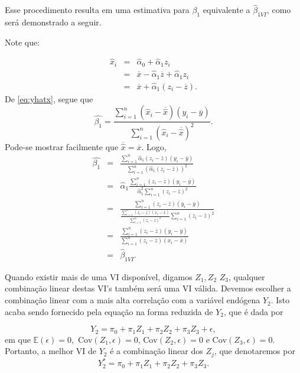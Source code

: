 \documentclass[
]{book}
\theoremstyle{definition}
\theoremstyle{definition}
\theoremstyle{definition}
\theoremstyle{remark}
\begin{document}
Esse procedimento resulta em uma estimativa para \(\beta_1\) equivalente a \(\hat{\beta}_{1VI}\), como será demonstrado a seguir.

Note que:

\begin{eqnarray*}
   \hat{x}_i&=& \hat{\alpha}_0+\hat{\alpha}_1 z_i\\
            &=&\overline{x}-\hat{\alpha}_1\overline{z}+\hat{\alpha}_1z_i\\
	    &=&\overline{x}+\hat{\alpha}_1(z_i-\overline{z}).
\end{eqnarray*}
De \eqref{eq:yhatx}, segue que
\begin{equation*}
 \hat{\beta_1}=\frac{\sum_{i=1}^{n}(\hat{x}_i-\overline{\hat{x}})(y_i-\overline{y})}
               {\sum_{i=1}^{n}(\hat{x}_i-\overline{\hat{x}})^2}.
\end{equation*}
Pode-se mostrar facilmente que \(\overline{\hat{x}}=\overline{x}\). Logo,
\begin{eqnarray*}
 \hat{\beta_1}&=&\frac{\sum_{i=1}^{n}\hat{\alpha}_1(z_i-\overline{z})(y_i-\overline{y})}
               {\sum_{i=1}^{n}(\hat{\alpha}_1(z_i-\overline{z}))^2}\\
	      &=&\hat{\alpha}_1\frac{\sum_{i=1}^{n}(z_i-\overline{z})(y_i-\overline{y})}
	       {\hat{\alpha}_1^2\sum_{i=1}^{n}(z_i-\overline{z})^2}\\
	      &=&\frac{\sum_{i=1}^{n}(z_i-\overline{z})(y_i-\overline{y})}
	         { \frac{\sum_{i=1}^{n}(z_i-\overline{z})(x_i-\overline{x})}{\sum_{i=1}^{n}(z_i-\overline{z})^2}\sum_{i=1}^{n}(z_i-\overline{z})^2}\\
	      &=&\frac{\sum_{i=1}^{n}(z_i-\overline{z})(y_i-\overline{y})}
		{\sum_{i=1}^{n}(z_i-\overline{z})(x_i-\overline{x})}\\
	      &=&\hat{\beta}_{1VI}.
\end{eqnarray*}

Quando existir mais de uma VI disponível, digamos \(Z_1,Z_2\) \(Z_3\), qualquer combinação linear destas VI's também será uma VI válida. Devemos escolher a combinação linear com a mais alta correlação com a variável endógena \(Y_2\). Isto acaba sendo fornecido pela equação na forma reduzida de \(Y_2\), que é dada por

\begin{equation}
 Y_2=\pi_0+\pi_1Z_1+\pi_2Z_2+\pi_3Z_3+\epsilon,
 \label{eq:formaredvv123}
\end{equation}
em que \(\mathbb{E}(\epsilon)=0,\) \(\mbox{Cov}(Z_1,\epsilon)=0\), \(\mbox{Cov}(Z_2,\epsilon)=0\) e \(\mbox{Cov}(Z_3,\epsilon)=0\). Portanto, a melhor VI de \(Y_2\) é a combinação linear dos \(Z_j\), que denotaremos por
\begin{equation}
   Y_2^*=\pi_0+\pi_1Z_1+\pi_2Z_2+\pi_3Z_3.
    \label{eq:cly}
  \end{equation}
\end{document}

